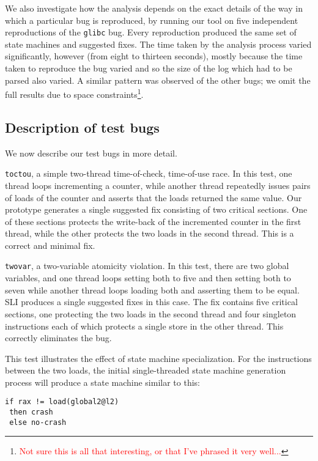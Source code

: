 \documentclass[10pt,twocolumn,preprint,natbib,authoryear]{sigplanconf}
\newcommand{\editorial}[1]{\textcolor{red}{\footnote{\textcolor{red}{#1}}}}
\begin{document}
We also investigate how the analysis depends on the exact details of
the way in which a particular bug is reproduced, by running our tool
on five independent reproductions of the \verb|glibc| bug.  Every
reproduction produced the same set of state machines and suggested
fixes.  The time taken by the analysis process varied significantly,
however (from eight to thirteen seconds), mostly because the time
taken to reproduce the bug varied and so the size of the log which had
to be parsed also varied.  A similar pattern was observed of the other
bugs; we omit the full results due to space constraints\editorial{Not
  sure this is all that interesting, or that I've phrased it very
  well...}.

\subsection{Description of test bugs}
\label{sect:bug_descr}

We now describe our test bugs in more detail.

\verb|toctou|, a simple two-thread time-of-check, time-of-use race.
In this test, one thread loops incrementing a counter, while another
thread repeatedly issues pairs of loads of the counter and asserts
that the loads returned the same value.  Our prototype generates a
single suggested fix consisting of two critical sections.  One of
these sections protects the write-back of the incremented counter in
the first thread, while the other protects the two loads in the second
thread.  This is a correct and minimal fix.

\verb|twovar|, a two-variable atomicity violation.  In this test,
there are two global variables, and one thread loops setting both to
five and then setting both to seven while another thread loops loading
both and asserting them to be equal.  SLI produces a single suggested
fixes in this case.  The fix contains five critical sections, one
protecting the two loads in the second thread and four singleton
instructions each of which protects a single store in the other
thread.  This correctly eliminates the bug.

This test illustrates the effect of state machine specialization.  For
the instructions between the two loads, the initial single-threaded
state machine generation process will produce a state machine similar
to this:

\begin{verbatim}
if rax != load(global2@l2)
 then crash
 else no-crash
\end{verbatim}
\end{document}

